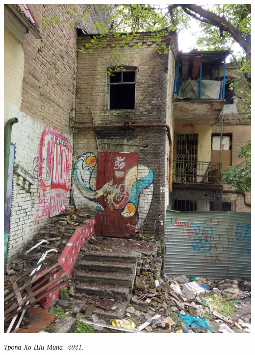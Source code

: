 \begin{center}
\includegraphics[width=\linewidth]{rpix/IMG_20210601_135245.jpg}

\textit{Тропа Хо Ши Мина. 2021.}
\end{center}


\vspace*{\fill}

\newpage

\vspace*{\fill}


